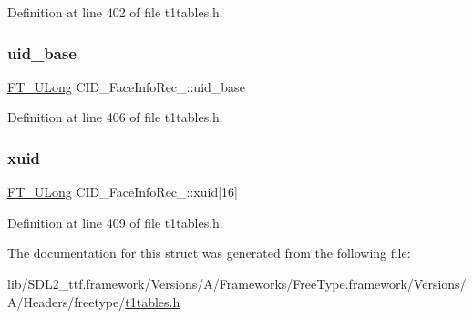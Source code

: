 Definition at line 402 of file t1tables.\+h.

\mbox{\label{struct_c_i_d___face_info_rec___a1fae2d9b863a9e27089894789ab4413e}} 
\subsubsection{\texorpdfstring{uid\_base}{uid\_base}}
{\footnotesize\ttfamily \mbox{\hyperlink{fttypes_8h_a4fac88bdba78eb76b505efa6e4fbf3f5}{F\+T\+\_\+\+U\+Long}} C\+I\+D\+\_\+\+Face\+Info\+Rec\+\_\+\+::uid\+\_\+base}



Definition at line 406 of file t1tables.\+h.

\mbox{\label{struct_c_i_d___face_info_rec___a32cd8836dd8a395d9aa6fb5831f06b27}} 
\subsubsection{\texorpdfstring{xuid}{xuid}}
{\footnotesize\ttfamily \mbox{\hyperlink{fttypes_8h_a4fac88bdba78eb76b505efa6e4fbf3f5}{F\+T\+\_\+\+U\+Long}} C\+I\+D\+\_\+\+Face\+Info\+Rec\+\_\+\+::xuid\mbox{[}16\mbox{]}}



Definition at line 409 of file t1tables.\+h.



The documentation for this struct was generated from the following file\+:\begin{DoxyCompactItemize}
\item 
lib/\+S\+D\+L2\+\_\+ttf.\+framework/\+Versions/\+A/\+Frameworks/\+Free\+Type.\+framework/\+Versions/\+A/\+Headers/freetype/\mbox{\hyperlink{t1tables_8h}{t1tables.\+h}}\end{DoxyCompactItemize}
